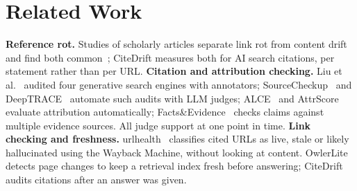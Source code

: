 \section{Related Work}
\label{sec:related}
\textbf{Reference rot.} Studies of scholarly articles separate link rot from content drift and find both common~\cite{Klein_2014,Jones_2016}; CiteDrift measures both for AI search citations, per statement rather than per URL.
\textbf{Citation and attribution checking.} Liu et al.~\cite{Liu_2023} audited four generative search engines with annotators; SourceCheckup~\cite{Wu_2025} and DeepTRACE~\cite{venkit2025deeptraceauditingdeepresearch} automate such audits with LLM judges; ALCE~\cite{Gao_2023} and AttrScore~\cite{Yue_2023} evaluate attribution automatically; Facts\&Evidence~\cite{Boonsanong_2025} checks claims against multiple evidence sources. All judge support at one point in time.
\textbf{Link checking and freshness.} urlhealth~\cite{rao2026detectingcorrectingreferencehallucinations} classifies cited URLs as live, stale or likely hallucinated using the Wayback Machine, without looking at content. OwlerLite~\cite{Zerhoudi_2026} detects page changes to keep a retrieval index fresh before answering; CiteDrift audits citations after an answer was given.
